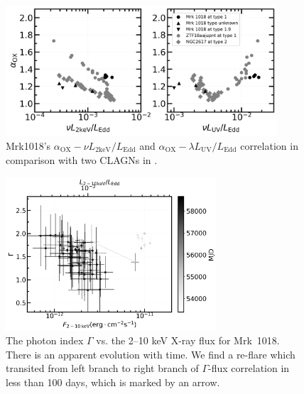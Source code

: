 \documentclass[twocolumn]{aastex63}
\begin{document}
\begin{figure}
\centering
	\includegraphics[width=0.9\textwidth]{./pic/Mrk1018_subplots_plus_2individuals_alpha_ox_L_x_Luv_rate.png}
    \caption{Mrk1018's $\alpha_\mathrm{OX}-\nu L_\mathrm{2keV}/L_\mathrm{Edd}$ and $\alpha_\mathrm{OX}-\lambda L_\mathrm{UV}/L_\mathrm{Edd}$ correlation in comparison with two CLAGNs in \citet{2019arXiv190904676R}.}   
    \label{fig:alpha_ox_lx_luv}
\end{figure}

\begin{figure}
\centering
	\includegraphics[width=0.7\textwidth]{./pic/xrayappendgood-errorbar-f-g-tmap.png}
    \caption{The photon index $\Gamma$ vs. the 2--10 keV X-ray flux for Mrk~1018. There is an apparent evolution with time. We find a re-flare  which transited from left branch to right branch of $\Gamma$-flux correlation in less than 100 days, which is marked by an arrow. }
    \label{fig:xrayappendgood-fandg-tmap}
\end{figure}
\end{document}
